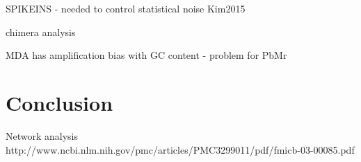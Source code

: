 


SPIKEINS - needed to control statistical noise Kim2015

chimera analysis


MDA has amplification bias with GC content - problem for PbMr \citep{Macaulay2014}



\section{Conclusion}


Network analysis
http://www.ncbi.nlm.nih.gov/pmc/articles/PMC3299011/pdf/fmicb-03-00085.pdf



